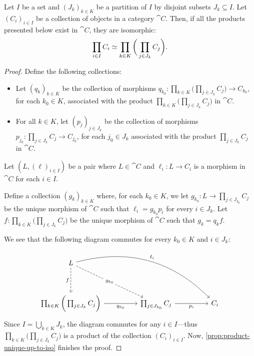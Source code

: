 \begin{proposition}
\label{prop:product-ordering-independent}
Let \(I\) be a set and \((J_k)_{k \in K}\) be a partition of \(I\) by disjoint
subsets \(J_k \subseteq I\). Let \((C_i)_{i \in I}\) be a collection of objects
in a category \(\cat C\). Then, if all the products presented below exist in
\(\cat C\), they are isomorphic:
\[
\prod_{i \in I} C_i \simeq \prod_{k \in K} \bigg(\prod_{j \in J_k} C_j \bigg).
\]
\end{proposition}

\begin{proof}
Define the following collections:
\begin{itemize}\setlength\itemsep{0em}
\item Let \((q_k)_{k \in K}\) be the collection of morphisms
  \(q_{k_0}: \prod_{k \in K} \bigg( \prod_{j \in J_k} C_j \bigg) \to C_{k_0}\),
  for each \(k_0 \in K\), associated with the product
  \(\prod_{k \in K} \bigg( \prod_{j \in J_k} C_j \bigg)\) in \(\cat C\).

\item For all \(k \in K\), let \((p_j)_{j \in J_k}\) be the collection of
  morphisms \(p_{j_0}: \prod_{j \in J_k} C_j \to C_{j_0}\), for each
  \(j_0 \in J_k\) associated with the product \(\prod_{j \in J_k} C_j\) in
  \(\cat C\).
\end{itemize}
Let \((L, (\ell)_{i \in I})\) be a pair where \(L \in \cat C\) and
\(\ell_i: L \to C_i\) is a morphism in \(\cat C\) for each \(i \in I\).

Define a collection \((g_k)_{k \in K}\) where, for each \(k_0 \in K\), we let
\(g_{k_0}: L \to \prod_{j \in J_{k_0}} C_j\) be the unique morphism of
\(\cat C\) such that \(\ell_i = g_{k_0} p_i\) for every \(i \in J_k\). Let
\(f: \prod_{k \in K} \bigg( \prod_{j \in J_k} C_j \bigg)\) be the unique
morphism of \(\cat C\) such that \(g_k = q_k f\).

We see that the following diagram commutes for every \(k_0 \in K\) and
\(i \in J_k\):
\[
\begin{tikzcd}
L \ar[rrrrdd, bend left, "\ell_i"]
\ar[dd, dashed, "f"']
\ar[rrdd, dashed, "g_{k_0}" description]
& & & &\\ & & & & \\
\prod_{k \in K} \bigg( \prod_{j \in J_k} C_j \bigg)
\ar[rr, "q_{k_0}"']
&
&\prod_{j \in J_{k_0}} C_j \ar[rr, "p_i"']
&
&C_i
\end{tikzcd}
\]
Since \(I = \bigcup_{k \in K} J_k\), the diagram commutes for any
\(i \in I\)---thus \(\prod_{k \in K} \bigg( \prod_{j \in J_k} C_j \bigg)\) is a
product of the collection \((C_i)_{i \in I}\). Now,
\cref{prop:product-unique-up-to-iso} finishes the proof.
\end{proof}

